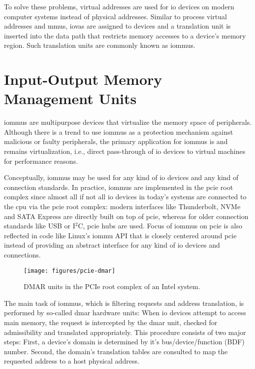 To solve these problems, virtual addresses are used for \ac{io} devices on
modern computer systems instead of physical addresses. Similar to process
virtual addresses and \acp{mmu}, \acp{iova} are assigned to devices and a
translation unit is inserted into the data path that restricts memory accesses
to a device's memory region. Such translation units are commonly known as
\acfp{iommu}.


\section{Input-Output Memory Management Units}
\label{sec:iommus}

\acp{iommu} are multipurpose devices that virtualize the memory space of
peripherals. Although there is a trend to use \acp{iommu} as a protection
mechanism against malicious or faulty peripherals, the primary application for
\acp{iommu} is and remains virtualization, i.e., direct pass-through of \ac{io}
devices to virtual machines for performance reasons.

Conceptually, \acp{iommu} may be used for any kind of \ac{io} devices and any
kind of connection standards. In practice, \acp{iommu} are implemented in the
\ac{pcie} root complex since almost all if not all \ac{io} devices in today's
systems are connected to the \ac{cpu} via the \ac{pcie} root complex: modern
interfaces like Thunderbolt, NVMe and SATA Express are directly built on top of
\ac{pcie}, whereas for older connection standards like USB or I$^2$C, \ac{pcie}
hubs are used. Focus of \acp{iommu} on \ac{pcie} is also reflected in code like
Linux's \ac{iommu} API that is closely centered around \ac{pcie} instead of
providing an abstract interface for any kind of \ac{io} devices and connections.

\begin{figure}
    \centering
    \texttt{[image: figures/pcie-dmar]}
    \caption{DMAR units in the PCIe root complex of an Intel system.}
    \label{fig:pcie-dmar}
\end{figure}

The main task of \acp{iommu}, which is filtering requests and address
translation, is performed by so-called \ac{dmar} hardware units: When \ac{io}
devices attempt to access main memory, the request is intercepted by the
\ac{dmar} unit, checked for admissibility and translated appropriately. This
procedure consists of two major steps: First, a device's domain is determined by
it's bus/device/function (BDF) number. Second, the domain's translation tables
are consulted to map the requested address to a host physical address.

